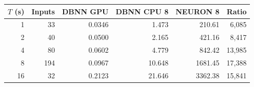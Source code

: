 \begin{tabular}{rrrrrr}
\toprule
$T$ (s) & Inputs & DBNN GPU & DBNN CPU 8 & NEURON 8 & Ratio\\
\midrule
1 & 33 & 0.0346 & 1.473 & 210.61 & 6,085 \\
2 & 40 & 0.0500 & 2.165 & 421.16 & 8,417 \\
4 & 80 & 0.0602 & 4.779 & 842.42 & 13,985 \\
8 & 194 & 0.0967 & 10.648 & 1681.45 & 17,388 \\
16 & 32 & 0.2123 & 21.646 & 3362.38 & 15,841 \\
\bottomrule
\end{tabular}
